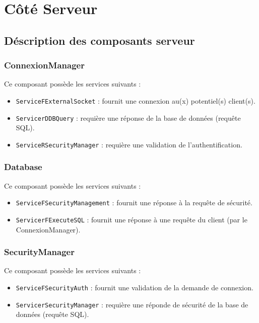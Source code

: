 \section{Côté Serveur}
\subsection{Déscription des composants serveur}
\subsubsection{ConnexionManager}
Ce composant possède les services suivants : 
\begin{itemize}
\item 
  \verb+ServiceFExternalSocket+ : fournit une connexion au(x) potentiel(s) client(s).
\item 
  \verb+ServicerDDBQuery+ :  requière une réponse de la base de données (requête SQL).
\item 
  \verb+ServiceRSecurityManager+ :  requière une validation de l'authentification.
\end{itemize}

\subsubsection{Database}
Ce composant possède les services suivants : 
\begin{itemize}
\item 
  \verb+ServiceFSecurityManagement+ :  fournit une réponse à la requête de sécurité.
\item 
  \verb+ServicerFExecuteSQL+ :  fournit une réponse à une requête du client (par le ConnexionManager).
\end{itemize}

\subsubsection{SecurityManager}
Ce composant possède les services suivants : 
\begin{itemize}
\item 
  \verb+ServiceFSecurityAuth+ : fournit une validation de la demande de connexion.
\item 
  \verb+ServicerSecurityManager+ :  requière une réponde de sécurité de la base de données (requête SQL).
\end{itemize}

